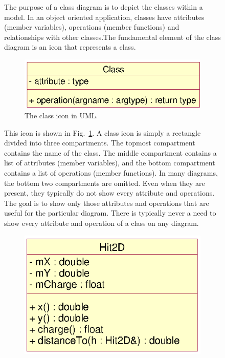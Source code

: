\documentclass[twoside]{article}
\begin{document}
\begin{figure}[htb]
\begin{center}
The purpose of a class diagram is to depict the classes within a
model. In an object oriented application, classes have attributes
(member variables), operations (member functions) and relationships
with other classes.The fundamental element of the class diagram is an
icon that represents a class.
\begin{figure}[htb]
    \begin{center}
        \includegraphics{umlClassIcon.eps}
        \caption{The class icon in UML.}
        \label{fig:umlClassIcon}
    \end{center}
\end{figure}
This icon is shown in Fig.~\ref{fig:umlClassIcon}.  A class icon is
simply a rectangle divided into three compartments. The topmost
compartment contains the name of the class. The middle compartment
contains a list of attributes (member variables), and the bottom
compartment contains a list of operations (member functions).  In many
diagrams, the bottom two compartments are omitted. Even when they are
present, they typically do not show every attribute and operations.
The goal is to show only those attributes and operations that are
useful for the particular diagram.  There is typically never a need to
show every attribute and operation of a class on any diagram.
\begin{figure}[htb]
    \begin{center}
        \includegraphics{umlClass.eps}

\end{center}
\end{figure}
\end{center}
\end{figure}
\end{document}
